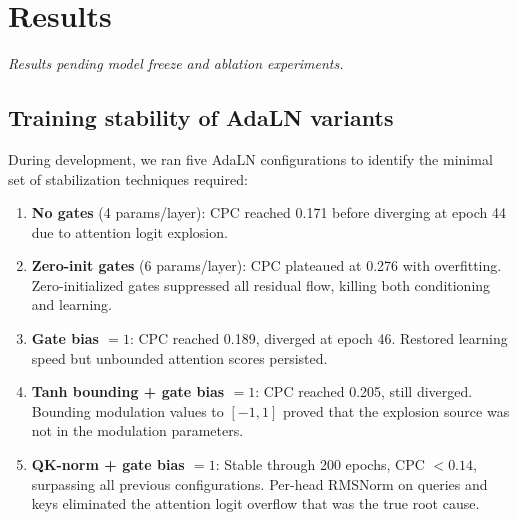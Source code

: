 \documentclass{article}
\begin{document}
\section{Results}
\label{sec:results}


\textit{Results pending model freeze and ablation experiments.}

\subsection{Training stability of AdaLN variants}
\label{sec:training_stability}


During development, we ran five AdaLN configurations to identify the minimal set of stabilization techniques required:

\begin{enumerate}
  \item \textbf{No gates} (4 params/layer): CPC reached 0.171 before diverging at epoch 44 due to attention logit explosion.
  \item \textbf{Zero-init gates} (6 params/layer): CPC plateaued at 0.276 with overfitting. Zero-initialized gates suppressed all residual flow, killing both conditioning and learning.
  \item \textbf{Gate bias $= 1$}: CPC reached 0.189, diverged at epoch 46. Restored learning speed but unbounded attention scores persisted.
  \item \textbf{Tanh bounding + gate bias $= 1$}: CPC reached 0.205, still diverged. Bounding modulation values to $[-1, 1]$ proved that the explosion source was not in the modulation parameters.
  \item \textbf{QK-norm + gate bias $= 1$}: Stable through 200 epochs, CPC $< 0.14$, surpassing all previous configurations. Per-head RMSNorm on queries and keys eliminated the attention logit overflow that was the true root cause.
\end{enumerate}
\end{document}
